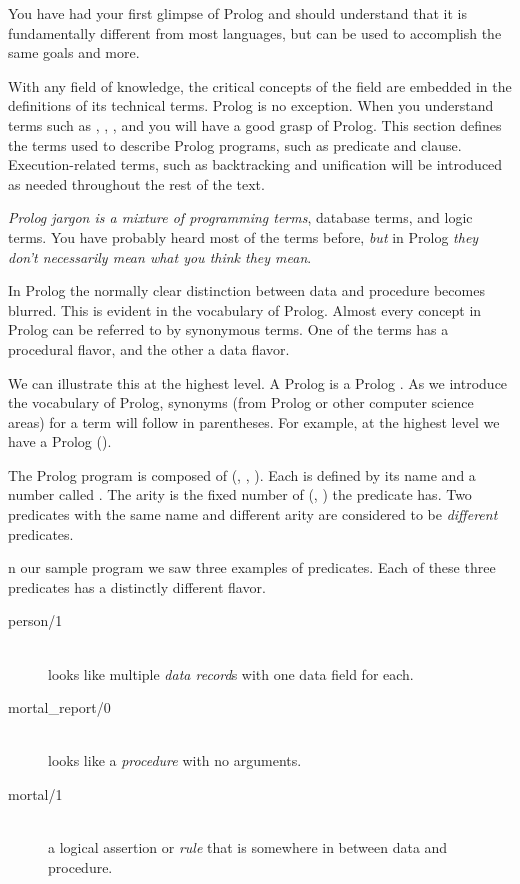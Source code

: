 You have had your first glimpse of Prolog and should understand that it is
fundamentally different from most languages, but can be used to accomplish the
same goals and more.


With any field of knowledge, the critical concepts of the field are embedded in
the definitions of its technical terms. Prolog is no exception. When you
understand terms such as , , ,
and  you will have a good grasp of Prolog. This section
defines the terms used to describe Prolog programs, such as predicate and
clause. Execution-related terms, such as backtracking and unification will be
introduced as needed throughout the rest of the text.

\emph{Prolog jargon is a mixture of programming terms}, database terms, and
logic terms. You have probably heard most of the terms before, \emph{but} in
Prolog \emph{they don't necessarily mean what you think they mean}.

In Prolog the normally clear distinction between data and procedure becomes
blurred. This is evident in the vocabulary of Prolog. Almost every concept in
Prolog can be referred to by synonymous terms. One of the terms has a procedural
flavor, and the other a data flavor.

We can illustrate this at the highest level. A Prolog  is a Prolog
. As we introduce the vocabulary of Prolog, synonyms (from
Prolog or other computer science areas) for a term will follow in parentheses.
For example, at the highest level we have a Prolog
 ().

The Prolog program is composed of 
(, , ). Each is
defined by its name and a number called . The
arity is the fixed number of  (, )
the predicate has. Two predicates with the same name and different arity are
considered to be \emph{different} predicates.

n our sample program we saw three examples of predicates. Each of these three
predicates has a distinctly different flavor.
\begin{description}
\item[person/1]\ \\
looks like multiple \emph{data record}s with one data field for each.
\item[mortal\_report/0]\ \\
looks like a \emph{procedure} with no arguments.
\item[mortal/1]\ \\
a logical assertion or \emph{rule} that is somewhere in between data and
procedure.
\end{description}

